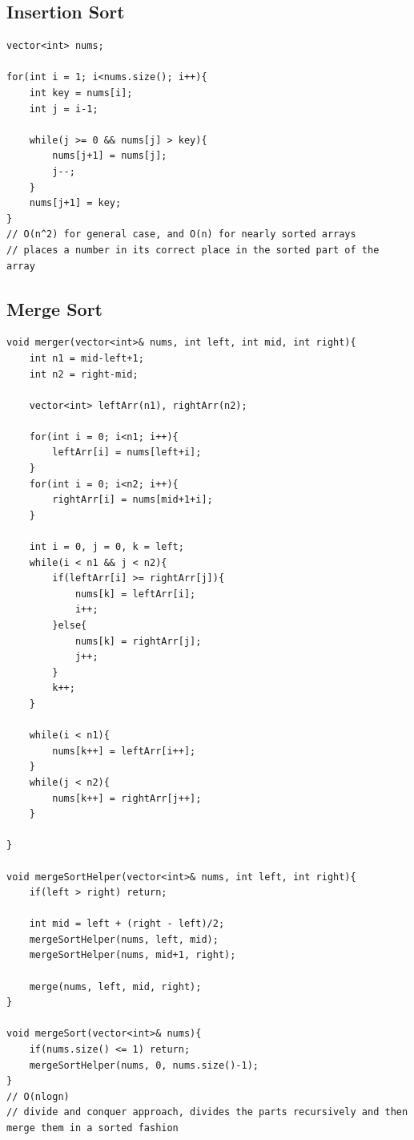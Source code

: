 \documentclass[11pt]{article}
\begin{document}
\subsection{Insertion Sort}
\begin{minipage}{\linewidth}
\begin{lstlisting}
vector<int> nums;

for(int i = 1; i<nums.size(); i++){
	int key = nums[i];
	int j = i-1;

	while(j >= 0 && nums[j] > key){
		nums[j+1] = nums[j];
		j--;
	}
	nums[j+1] = key;
}
// O(n^2) for general case, and O(n) for nearly sorted arrays
// places a number in its correct place in the sorted part of the array
\end{lstlisting}
\end{minipage}

\subsection{Merge Sort}
\begin{minipage}{\linewidth}
\begin{lstlisting}
void merger(vector<int>& nums, int left, int mid, int right){
	int n1 = mid-left+1;
	int n2 = right-mid;

	vector<int> leftArr(n1), rightArr(n2);

	for(int i = 0; i<n1; i++){
		leftArr[i] = nums[left+i];
	}
	for(int i = 0; i<n2; i++){
		rightArr[i] = nums[mid+1+i];
	}

	int i = 0, j = 0, k = left;
	while(i < n1 && j < n2){
		if(leftArr[i] >= rightArr[j]){
			nums[k] = leftArr[i];
			i++;
		}else{
			nums[k] = rightArr[j];
			j++;
		}
		k++;
	}

	while(i < n1){
		nums[k++] = leftArr[i++];
	}
	while(j < n2){
		nums[k++] = rightArr[j++];
	}
	
}

void mergeSortHelper(vector<int>& nums, int left, int right){
	if(left > right) return;

	int mid = left + (right - left)/2;
	mergeSortHelper(nums, left, mid);
	mergeSortHelper(nums, mid+1, right);

	merge(nums, left, mid, right);
}

void mergeSort(vector<int>& nums){
	if(nums.size() <= 1) return;
	mergeSortHelper(nums, 0, nums.size()-1);
}
// O(nlogn)
// divide and conquer approach, divides the parts recursively and then merge them in a sorted fashion
\end{lstlisting}
\end{minipage}
\end{document}
